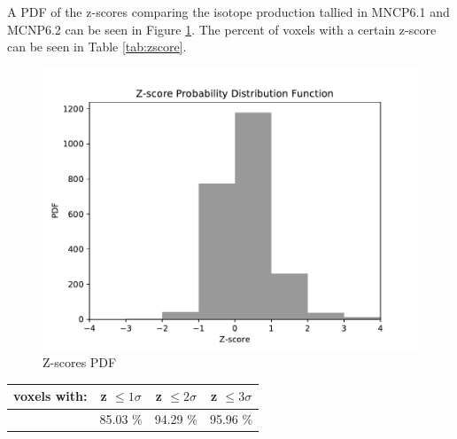 A PDF of the z-scores comparing the isotope production tallied in 
MNCP6.1 and MCNP6.2 can be seen in Figure \ref{fig:pdf}. 
The percent of voxels with a certain z-score can be seen in Table \ref{tab:zscore}. 
\begin{figure}[h!]
        \centering
        \includegraphics[scale=0.9]{figs/PDF.pdf}
        \caption{Z-scores PDF }
        \label{fig:pdf}
\end{figure}

\begin{center}
\begin{tabular}{ |c|c|c|c|}
 \hline
 voxels with: & z $\leq 1 \sigma$ & z $\leq 2 \sigma$ & z $\leq 3 \sigma$ \\
 \hline \hline
              & 85.03 \%          & 94.29 \%          & 95.96 \%           \\
 \hline
\end{tabular}
\label{tab:zscore}
\end{center}

